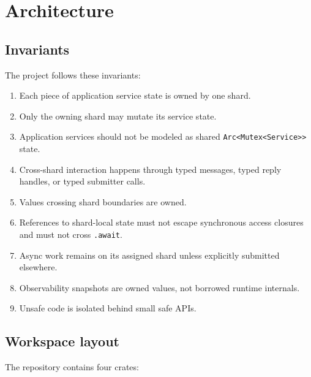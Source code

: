 \chapter{Architecture}
\label{chap:architecture}

\section{Invariants}

The project follows these invariants:

\begin{enumerate}
    \item Each piece of application service state is owned by one shard.
    \item Only the owning shard may mutate its service state.
    \item Application services should not be modeled as shared
          \texttt{Arc<Mutex<Service\textgreater{}\textgreater{}} state.
    \item Cross-shard interaction happens through typed messages, typed reply
          handles, or typed submitter calls.
    \item Values crossing shard boundaries are owned.
    \item References to shard-local state must not escape synchronous access
          closures and must not cross \texttt{.await}.
    \item Async work remains on its assigned shard unless explicitly submitted
          elsewhere.
    \item Observability snapshots are owned values, not borrowed runtime
          internals.
    \item Unsafe code is isolated behind small safe APIs.
\end{enumerate}

\section{Workspace layout}

The repository contains four crates:

